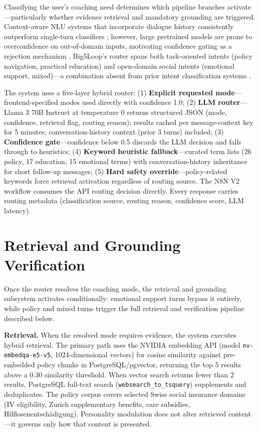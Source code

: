 \documentclass[10pt,a4paper]{report}
\begin{document}
Classifying the user's coaching need determines which pipeline branches activate---particularly whether evidence retrieval and mandatory grounding are triggered. Context-aware NLU systems that incorporate dialogue history consistently outperform single-turn classifiers \citep{Gupta2019b}; however, large pretrained models are prone to overconfidence on out-of-domain inputs, motivating confidence gating as a rejection mechanism \citep{Wang2024}. Big5Loop's router spans both task-oriented intents (policy navigation, practical education) and open-domain social intents (emotional support, mixed)---a combination absent from prior intent classification systems \citep{Liu2024}.

The system uses a five-layer hybrid router: (1) \textbf{Explicit requested mode}---frontend-specified modes used directly with confidence 1.0; (2) \textbf{LLM router}---Llama 3 70B Instruct at temperature 0 returns structured JSON (mode, confidence, retrieval flag, routing reason); results cached per message-context key for 5 minutes; conversation-history context (prior 3 turns) included; (3) \textbf{Confidence gate}---confidence below 0.5 discards the LLM decision and falls through to heuristics; (4) \textbf{Keyword heuristic fallback}---curated term lists (26 policy, 17 education, 15 emotional terms) with conversation-history inheritance for short follow-up messages; (5) \textbf{Hard safety override}---policy-related keywords force retrieval activation regardless of routing source. The N8N V2 workflow consumes the API routing decision directly. Every response carries routing metadata (classification source, routing reason, confidence score, LLM latency).

\section{Retrieval and Grounding Verification}

Once the router resolves the coaching mode, the retrieval and grounding subsystem activates conditionally: emotional support turns bypass it entirely, while policy and mixed turns trigger the full retrieval and verification pipeline described below.

\textbf{Retrieval.} When the resolved mode requires evidence, the system executes hybrid retrieval. The primary path uses the NVIDIA embedding API (model \texttt{nv-embedqa-e5-v5}, 1024-dimensional vectors) for cosine similarity against pre-embedded policy chunks in PostgreSQL/pgvector, returning the top 5 results above a 0.30 similarity threshold. When vector search returns fewer than 2 results, PostgreSQL full-text search (\texttt{websearch\_to\_tsquery}) supplements and deduplicates. The policy corpus covers selected Swiss social insurance domains (IV eligibility, Zurich supplementary benefits, care subsidies, Hilflosenentschädigung). Personality modulation does not alter retrieved content---it governs only how that content is presented.
\end{document}

